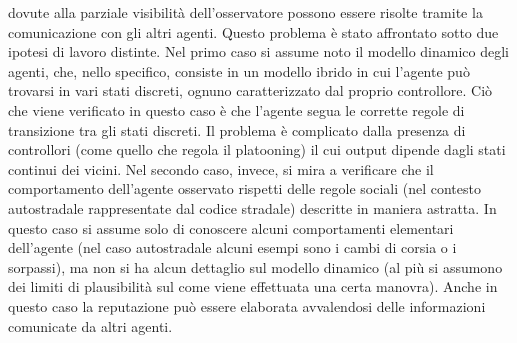 \documentclass[a4paper,12pt]{article} %
\begin{document}
\clearpage
\userinformation
\framebreak
dovute alla parziale visibilit\`a dell'osservatore possono essere risolte tramite la comunicazione con gli altri agenti. Questo problema \`e stato affrontato sotto due ipotesi di lavoro distinte. Nel primo caso si assume noto il modello dinamico degli agenti, che, nello specifico, consiste in un modello ibrido in cui l'agente pu\`o trovarsi in vari stati discreti, ognuno caratterizzato dal proprio controllore. Ci\`o che viene verificato in questo caso \`e che l'agente segua le corrette regole di transizione tra gli stati discreti. Il problema \`e complicato dalla presenza di controllori (come quello che regola il platooning) il cui output dipende dagli stati continui dei vicini. Nel secondo caso, invece, si mira a verificare che il comportamento dell'agente osservato rispetti delle regole sociali (nel contesto autostradale rappresentate dal codice stradale) descritte in maniera astratta. In questo caso si assume solo di conoscere alcuni comportamenti elementari dell'agente (nel caso autostradale alcuni esempi sono i cambi di corsia o i sorpassi), ma non si ha alcun dettaglio
sul modello dinamico (al pi\`u si assumono dei limiti di plausibilit\`a sul come viene effettuata una certa manovra). Anche in questo caso la reputazione pu\`o essere elaborata avvalendosi delle informazioni comunicate da altri agenti.

\Sep %

\begin{table}[h!]
\centering
{}
\end{table}
\end{document}
